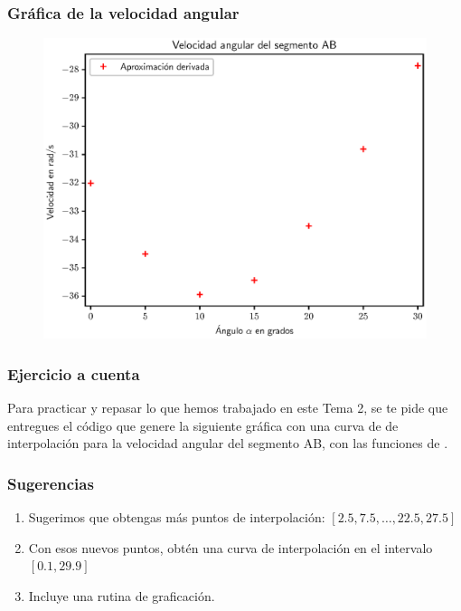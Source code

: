 \documentclass[12pt]{beamer}
\begin{document}
\begin{frame}
\frametitle{Gráfica de la velocidad angular}
\begin{figure}
    \centering
    \includegraphics[scale=0.55]{Imagenes/diferenciacion_ejercicio_segmento_01.eps}
\end{figure}
\end{frame}
\begin{frame}
\frametitle{Ejercicio a cuenta}
Para practicar y repasar lo que hemos trabajado en este Tema 2, se te pide que entregues el código que genere la siguiente gráfica con una curva de de interpolación para la velocidad angular del segmento AB, con las funciones de \python.
\end{frame}
\begin{frame}
\frametitle{Sugerencias}
\begin{enumerate}[<+->]
\item Sugerimos que obtengas más puntos de interpolación: $[2.5, 7.5, \ldots, 22.5, 27.5]$
\item Con esos nuevos puntos, obtén una curva de interpolación en el intervalo $[0.1, 29.9]$
\item Incluye una rutina de graficación.
\end{enumerate}
\end{frame}
\end{document}
